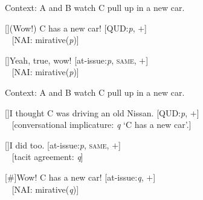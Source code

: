 \ea Context: A and B watch C pull up in a new car. \label{ex:recencyrestriction1} 
    \ea \label{ex:wowCnewcar_acc_prov}
    \begin{xlist}[A:]
	[]{(Wow!) C has a new car! \hfill [QUD:\textit{p}, $+$]\\
        ~ \hfill [\ac{NAI}: mirative(\textit{p})]  }
    \end{xlist}
    \ex \label{ex:wowCnewcar_acc_resp}	
    \begin{xlist}[A:]
	[]{Yeah, true, wow! \hfill [at-issue:\textit{p}, \textsc{same}, $+$]\\
        ~ \hfill [\ac{NAI}: mirative(\textit{p})]  }
    \end{xlist}
    \z
\z

\ea Context: A and B watch C pull up in a new car. \label{ex:recencyrestriction2}
    \ea \label{ex:wowCnewcar_unacc_prov1}
	\begin{xlist}[A:]
	[]{I thought C was driving an old Nissan. \hfill [QUD:\textit{p}, $+$]\\
	~ \hfill [conversational implicature: \textit{q} `C has a new car'.]}
        \end{xlist}
    \ex \label{ex:wowCnewcar_unacc_resp1}	 
        \begin{xlist}[A:]
	[]{I did too. \hfill [at-issue:\textit{p}, \textsc{same}, $+$]\\
	~ \hfill [tacit agreement: \textit{q}]}
        \end{xlist}
    \ex \label{ex:wowCnewcar_unacc_prov2}	 
        \begin{xlist}[A:]
        [\#]{Wow! C has a new car! \hfill [at-issue:\textit{q}, $+$]\\
	~ \hfill [\ac{NAI}: mirative(\textit{q})]}
        \end{xlist}
    \z
\z    


